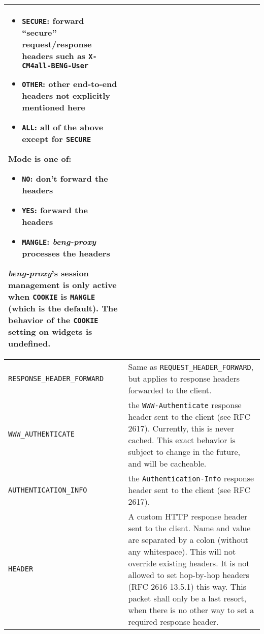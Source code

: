 \documentclass[a4paper,12pt]{article}
\begin{document}
\begin{longtable}{|l|p{8cm}|}
\begin{itemize}
\item \texttt{SECURE}: forward ``secure'' request/response headers
  such as \texttt{X-CM4all-BENG-User}

\item \texttt{OTHER}: other end-to-end headers not explicitly
  mentioned here

\item \texttt{ALL}: all of the above except for \texttt{SECURE}

\end{itemize}

Mode is one of:

\begin{itemize}
\item \texttt{NO}: don't forward the headers
\item \texttt{YES}: forward the headers
\item \texttt{MANGLE}: \emph{beng-proxy} processes the headers
\end{itemize}

\emph{beng-proxy}'s session management is only active when
\texttt{COOKIE} is \texttt{MANGLE} (which is the default).  The
behavior of the \texttt{COOKIE} setting on widgets is undefined.

\\

\hline

\verb|RESPONSE_HEADER_FORWARD| &

Same as \verb|REQUEST_HEADER_FORWARD|, but applies to response
headers forwarded to the client. \\

\hline

\verb|WWW_AUTHENTICATE| & the \texttt{WWW-Authenticate} response
header sent to the client (see RFC 2617).  Currently, this is never
cached.  This exact behavior is subject to change in the future, and
will be cacheable. \\

\hline

\verb|AUTHENTICATION_INFO| & the \texttt{Authentication-Info}
response header sent to the client (see RFC 2617). \\

\hline

\verb|HEADER| & A custom HTTP response header sent to the client.
Name and value are separated by a colon (without any whitespace).
This will not override existing headers.  It is not allowed to set
hop-by-hop headers (RFC 2616 13.5.1) this way.  This packet shall only
be a last resort, when there is no other way to set a required
response header. \\


\end{longtable}
\end{document}
